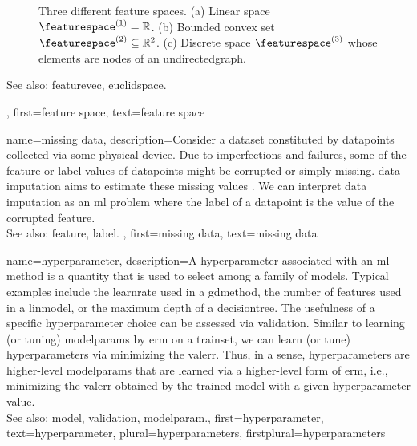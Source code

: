 {{\begin{figure}[H]
		\caption{Three different \gls{feature} spaces. (a) Linear space $\featurespace^{(1)} = \mathbb{R}$. (b) Bounded 
			\gls{convex} set $\featurespace^{(2)} \subseteq \mathbb{R}^{2}$. (c) Discrete space 
			$\featurespace^{(3)}$ whose elements are nodes of an \gls{undirectedgraph}. \label{fig_featurespace_dict}}
		\end{figure}
		See also: \gls{featurevec}, \gls{euclidspace}.},
	first={feature space},
	text={feature space}  
}

{name={missing data},
	description={Consider a \gls{dataset} constituted by \glspl{datapoint} collected via 
		some physical \gls{device}. Due to imperfections and failures, some of the \gls{feature} 
		or \gls{label} values of \glspl{datapoint} might be corrupted or simply missing. 
		\Gls{data} imputation aims to estimate these missing values \cite{Abayomi2008DiagnosticsFM}. 
		We can interpret \gls{data} imputation as an \gls{ml} problem where the \gls{label} of a \gls{datapoint} is 
		the value of the corrupted \gls{feature}.
				\\
		See also: \gls{feature}, \gls{label}. },
	first={missing data},
	text={missing data}  
}

{name={hyperparameter},
	description={A hyperparameter associated with an \gls{ml} method is 
		a quantity that is used to select among a family of \glspl{model}. 
		Typical examples include the \gls{learnrate} used in a \gls{gdmethod}, 
		the number of \glspl{feature} used in a \gls{linmodel}, or the 
		\gls{maximum} depth of a \gls{decisiontree}. The usefulness of a specific 
		hyperparameter choice can be assessed via \gls{validation}. Similar 
		to learning (or tuning) \glspl{modelparam} by \gls{erm} on a \gls{trainset}, 
		we can learn (or tune) hyperparameters via minimizing the \gls{valerr}. Thus, 
		in a sense, hyperparameters are higher-level \glspl{modelparam} that are learned 
		via a higher-level form of \gls{erm}, i.e., minimizing the \gls{valerr} obtained by 
		the trained \gls{model} with a given hyperparameter value. 
			\\ 
		See also: \gls{model}, \gls{validation}, \gls{modelparam}.},
	first={hyperparameter},
	text={hyperparameter},
	plural={hyperparameters},
	firstplural={hyperparameters}
}

